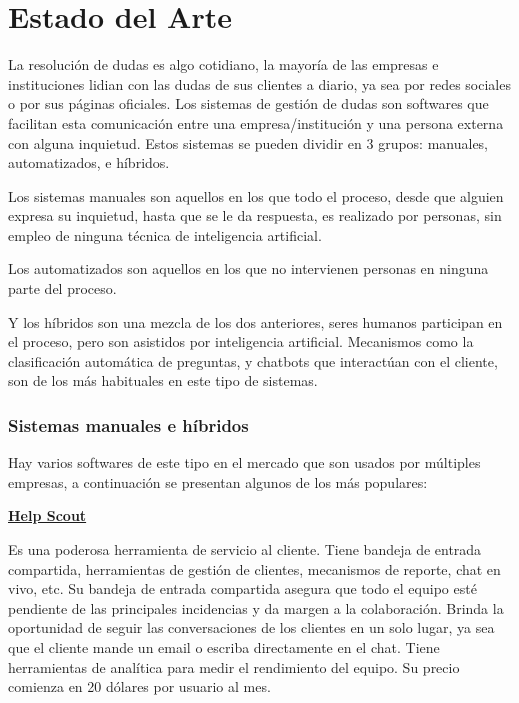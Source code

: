 \chapter{Estado del Arte}\label{chapter:state-of-the-art}

La resolución de dudas es algo cotidiano, la mayoría de las empresas e instituciones lidian con las dudas de sus clientes a diario, ya sea por redes sociales o por sus páginas oficiales. Los sistemas de gestión de dudas son softwares que facilitan esta comunicación entre una empresa/institución y una persona externa con alguna inquietud. Estos sistemas se pueden dividir en 3 grupos: manuales, automatizados, e híbridos.
\newline

Los sistemas manuales son aquellos en los que todo el proceso, desde que alguien expresa su inquietud, hasta que se le da respuesta, es realizado por personas, sin empleo de ninguna técnica de inteligencia artificial.
\newline

Los automatizados son aquellos en los que no intervienen personas en ninguna parte del proceso.
\newline

Y los híbridos son una mezcla de los dos anteriores, seres humanos participan en el proceso, pero son asistidos por inteligencia artificial. Mecanismos como la clasificación automática de preguntas, y chatbots que interactúan con el cliente, son de los más habituales en este tipo de sistemas. 

\subsection{Sistemas manuales e híbridos}

Hay varios softwares de este tipo en el mercado que son usados por múltiples empresas, a continuación se presentan algunos de los más populares:
\newline

\textbf{\href{https://www.helpscout.com/}{Help Scout}}
\newline

Es una poderosa herramienta de servicio al cliente. Tiene bandeja de entrada compartida, herramientas de gestión de clientes, mecanismos de reporte, chat en vivo, etc. Su bandeja de entrada compartida asegura que todo el equipo esté pendiente de las principales incidencias y da margen a la colaboración. Brinda la oportunidad de seguir las conversaciones de los clientes en un solo lugar, ya sea que el cliente mande un email o escriba directamente en el chat. Tiene herramientas de analítica para medir el rendimiento del equipo. Su precio comienza en 20 dólares por usuario al mes.
\newline

